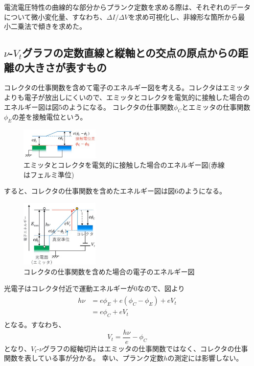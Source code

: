 \documentclass[a4paper,12pt]{jsarticle}
\begin{document}
電流電圧特性の曲線的な部分からプランク定数を求める際は、それぞれのデータについて微小変化量、すなわち、$\Delta I / \Delta V$を求め可視化し、非線形な箇所から最小二乗法で傾きを求めた。

\subsection{$\nu$-$V_t$グラフの定数直線と縦軸との交点の原点からの距離の大きさが表すもの}
コレクタの仕事関数を含めて電子のエネルギー図を考える。コレクタはエミッタよりも電子が放出しにくいので、エミッタとコレクタを電気的に接触した場合のエネルギー図は図5のようになる。
コレクタの仕事関数$\phi_C$とエミッタの仕事関数$\phi_E$の差を接触電位という。
\begin{figure}[H]
  \centering
  \includegraphics[width=0.35\textwidth]{figs/fig1.pdf}
  \caption{エミッタとコレクタを電気的に接触した場合のエネルギー図(赤線はフェルミ準位)}
\end{figure}

すると、コレクタの仕事関数を含めたエネルギー図は図6のようになる。
\begin{figure}[H]
  \centering
  \includegraphics[width=0.35\textwidth]{figs/fig2.pdf}
  \caption{コレクタの仕事関数を含めた場合の電子のエネルギー図}
\end{figure}
光電子はコレクタ付近で運動エネルギーが0なので、図より
\begin{align}
  \begin{split}
  h\nu &= e\phi_E + e(\phi_C - \phi_E) + eV_t \\ 
  &= e\phi_C + eV_t
  \end{split}
\end{align}
となる。すなわち、
\begin{equation}
  V_t = \frac{h\nu}{e} - \phi_C 
\end{equation}
となり、$V_t$-$\nu$グラフの縦軸切片はエミッタの仕事関数ではなく、コレクタの仕事関数を表している事が分かる。
幸い、プランク定数$h$の測定には影響しない。
\end{document}

